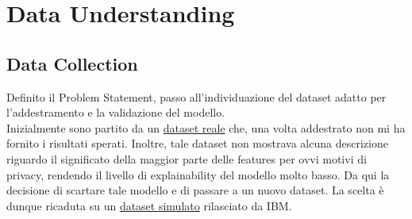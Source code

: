 \documentclass[]{article}
\begin{document}
\section{Data Understanding}
    \subsection{Data Collection}
        Definito il Problem Statement, passo all'individuazione del dataset adatto per l'addestramento e la validazione del modello.\\
        Inizialmente sono partito da un \href{https://www.kaggle.com/datasets/mlg-ulb/creditcardfraud}{dataset reale} che, una volta addestrato non mi ha fornito i risultati sperati. Inoltre, tale dataset non mostrava alcuna descrizione riguardo il significato della maggior parte delle features per ovvi motivi di privacy, rendendo il livello di explainability del modello molto basso. Da qui la decisione di scartare tale modello e di passare a un nuovo dataset.
        La scelta è dunque ricaduta su un \href{https://www.kaggle.com/datasets/ealtman2019/credit-card-transactions/data}{dataset simulato} rilasciato da IBM.
\end{document}
